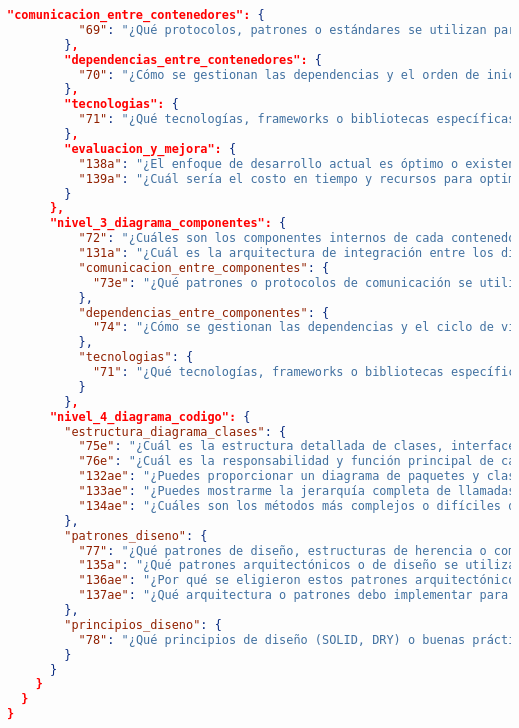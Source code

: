 \begin{lstlisting}[language=json, caption={Listado de elicitación de preguntas procesadas y clasificadas}, label={listado:preguntas}]
        "comunicacion_entre_contenedores": {
          "69": "¿Qué protocolos, patrones o estándares se utilizan para la comunicación entre los diferentes contenedores?"
        },
        "dependencias_entre_contenedores": {
          "70": "¿Cómo se gestionan las dependencias y el orden de inicio entre los diferentes contenedores?"
        },
        "tecnologias": {
          "71": "¿Qué tecnologías, frameworks o bibliotecas específicas utiliza cada contenedor o servicio?"
        },
        "evaluacion_y_mejora": {
          "138a": "¿El enfoque de desarrollo actual es óptimo o existen oportunidades de mejora identificadas?",
          "139a": "¿Cuál sería el costo en tiempo y recursos para optimizar el proceso de desarrollo actual?"
        }
      },
      "nivel_3_diagrama_componentes": {
          "72": "¿Cuáles son los componentes internos de cada contenedor y cuál es la función específica de cada uno?",
          "131a": "¿Cuál es la arquitectura de integración entre los diferentes servicios o componentes del sistema?",
          "comunicacion_entre_componentes": {
            "73e": "¿Qué patrones o protocolos de comunicación se utilizan entre los componentes dentro de un mismo contenedor?"
          },
          "dependencias_entre_componentes": {
            "74": "¿Cómo se gestionan las dependencias y el ciclo de vida entre los componentes de diferentes contenedores?"
          },
          "tecnologias": {
            "71": "¿Qué tecnologías, frameworks o bibliotecas específicas utiliza cada componente?"
          }
        },
      "nivel_4_diagrama_codigo": {
        "estructura_diagrama_clases": {
          "75e": "¿Cuál es la estructura detallada de clases, interfaces y objetos dentro de un componente específico?",
          "76e": "¿Cuál es la responsabilidad y función principal de cada clase o interfaz dentro del componente?",
          "132ae": "¿Puedes proporcionar un diagrama de paquetes y clases para entender la estructura del código?",
          "133ae": "¿Puedes mostrarme la jerarquía completa de llamadas para este método específico?",
          "134ae": "¿Cuáles son los métodos más complejos o difíciles de entender en el código y por qué?"
        },
        "patrones_diseno": {
          "77": "¿Qué patrones de diseño, estructuras de herencia o composición se implementan en el código?",
          "135a": "¿Qué patrones arquitectónicos o de diseño se utilizan en el proyecto (MVC, MVVM, etc.)?",
          "136ae": "¿Por qué se eligieron estos patrones arquitectónicos o de diseño específicos?",
          "137ae": "¿Qué arquitectura o patrones debo implementar para mi desarrollo actual?"
        },
        "principios_diseno": {
          "78": "¿Qué principios de diseño (SOLID, DRY) o buenas prácticas de código se aplican en el proyecto?"
        }
      }
    }
  }
}



\end{lstlisting}
